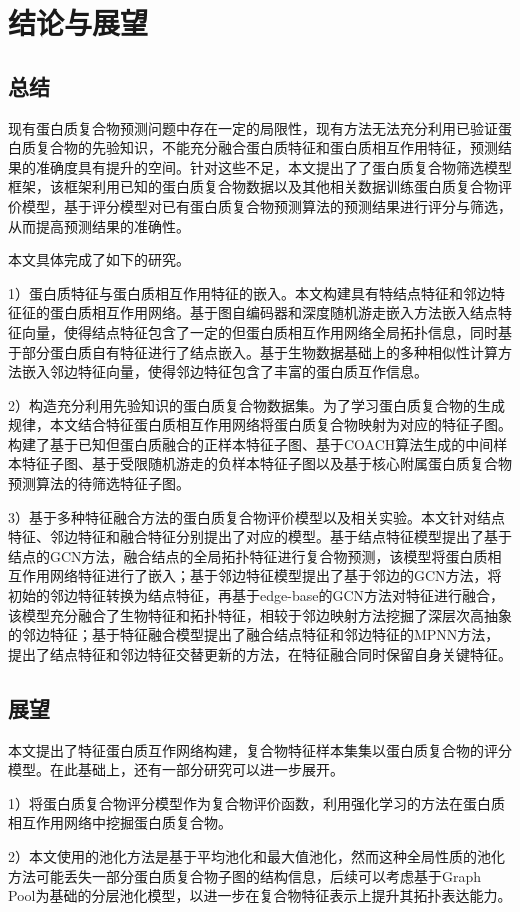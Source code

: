 \chapter{结论与展望}
\label{chapter:SummaryAndForward}

\section{总结}
\label{section:allsummary}

现有蛋白质复合物预测问题中存在一定的局限性，现有方法无法充分利用已验证蛋白质复合物的先验知识，不能充分融合蛋白质特征和蛋白质相互作用特征，预测结果的准确度具有提升的空间。针对这些不足，本文提出了了蛋白质复合物筛选模型框架，该框架利用已知的蛋白质复合物数据以及其他相关数据训练蛋白质复合物评价模型，基于评分模型对已有蛋白质复合物预测算法的预测结果进行评分与筛选，从而提高预测结果的准确性。

本文具体完成了如下的研究。

1）蛋白质特征与蛋白质相互作用特征的嵌入。本文构建具有特结点特征和邻边特征征的蛋白质相互作用网络。基于图自编码器和深度随机游走嵌入方法嵌入结点特征向量，使得结点特征包含了一定的但蛋白质相互作用网络全局拓扑信息，同时基于部分蛋白质自有特征进行了结点嵌入。基于生物数据基础上的多种相似性计算方法嵌入邻边特征向量，使得邻边特征包含了丰富的蛋白质互作信息。

2）构造充分利用先验知识的蛋白质复合物数据集。为了学习蛋白质复合物的生成规律，本文结合特征蛋白质相互作用网络将蛋白质复合物映射为对应的特征子图。构建了基于已知但蛋白质融合的正样本特征子图、基于COACH算法生成的中间样本特征子图、基于受限随机游走的负样本特征子图以及基于核心附属蛋白质复合物预测算法的待筛选特征子图。

3）基于多种特征融合方法的蛋白质复合物评价模型以及相关实验。本文针对结点特征、邻边特征和融合特征分别提出了对应的模型。基于结点特征模型提出了基于结点的GCN方法，融合结点的全局拓扑特征进行复合物预测，该模型将蛋白质相互作用网络特征进行了嵌入；基于邻边特征模型提出了基于邻边的GCN方法，将初始的邻边特征转换为结点特征，再基于edge-base的GCN方法对特征进行融合，该模型充分融合了生物特征和拓扑特征，相较于邻边映射方法挖掘了深层次高抽象的邻边特征；基于特征融合模型提出了融合结点特征和邻边特征的MPNN方法，提出了结点特征和邻边特征交替更新的方法，在特征融合同时保留自身关键特征。


\section{展望}
\label{section:forward}

本文提出了特征蛋白质互作网络构建，复合物特征样本集集以蛋白质复合物的评分模型。在此基础上，还有一部分研究可以进一步展开。

1）将蛋白质复合物评分模型作为复合物评价函数，利用强化学习的方法在蛋白质相互作用网络中挖掘蛋白质复合物。

2）本文使用的池化方法是基于平均池化和最大值池化，然而这种全局性质的池化方法可能丢失一部分蛋白质复合物子图的结构信息，后续可以考虑基于Graph Pool为基础的分层池化模型，以进一步在复合物特征表示上提升其拓扑表达能力。

